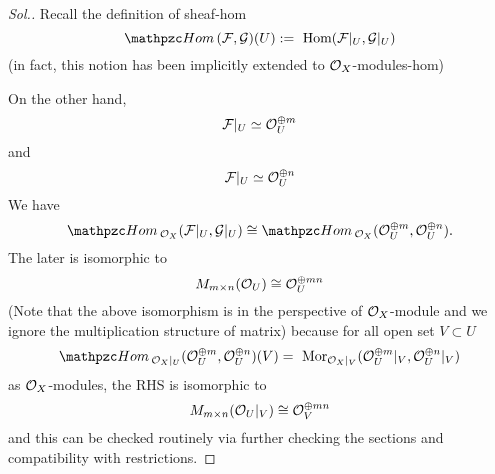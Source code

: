 \documentclass[11pt]{book} %
\begin{document}
\begin{proof}[Sol.]
Recall the definition of sheaf-hom
$$
\phom(\calf,\calg)(U):=\hom(\calf|_U,\calg|_U)
$$
(in fact, this notion has been implicitly extended to ${\cal O}_X$-modules-hom)

On the other hand, 
$$
{\cal F}|_U\simeq {\cal O}_U^{\oplus m}
$$
and
$$
{\cal F}|_U\simeq {\cal O}_U^{\oplus n}
$$
We have
$$
\phom_{\calo_X}(\calf|_U,\calg|_U)\cong\phom_{\calo_X}(\calo_U^{\oplus m},\calo_U^{\oplus n}).
$$
The later is isomorphic to 
$$
M_{m\times n}({\cal O}_U)\cong{\cal O}_U^{\oplus mn}
$$
(Note that the above isomorphism is in the perspective of ${\cal O}_X$-module and we ignore the multiplication structure of matrix)
because for all open set $V\subset U$
$$
\phom_{\calo_X|_U}(\calo_U^{\oplus m},\calo_U^{\oplus n})(V)=\mor_{\calo_X|_V}(\calo_U^{\oplus m}|_V,\calo_U^{\oplus n}|_V)
$$
as ${\cal O}_X$-modules, the RHS is isomorphic to
$$
M_{m\times n} ({\cal O}_U|_V)\cong {\cal O}_V^{\oplus mn}
$$
and this can be checked routinely via further checking the sections and compatibility with restrictions.

\end{proof}
\end{document}
